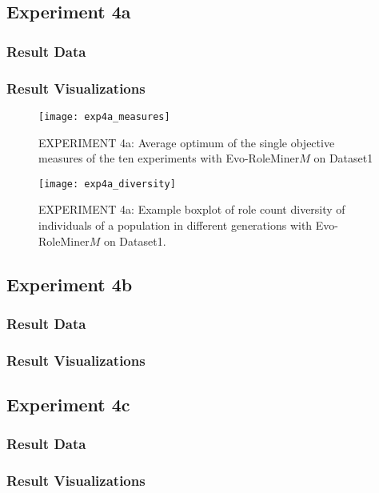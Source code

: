 	\subsection{Experiment 4a}
	\label{sec:A_Exp4a}
		\subsubsection{Result Data}
		\label{sec:A_Exp4a_Data}
		\subsubsection{Result Visualizations}
		\label{sec:A_Exp4a_Diagrams}
			\begin{figure}[H]
				\centering
				\texttt{[image: exp4a\_measures]}
				\caption{EXPERIMENT 4a: Average optimum of the single objective measures of the ten experiments with Evo-RoleMiner$M$ on Dataset1}
				\label{fig:exp4a_measures}
			\end{figure}
			\begin{figure}[H]
				\centering
				\texttt{[image: exp4a\_diversity]}
				\caption{EXPERIMENT 4a: Example boxplot of role count diversity of individuals of a population in different generations with Evo-RoleMiner$M$ on Dataset1.}
				\label{fig:exp4a_diversity}
			\end{figure}

	\subsection{Experiment 4b}
	\label{sec:A_Exp4b}
		\subsubsection{Result Data}
		\label{sec:A_Exp4b_Data}
		\subsubsection{Result Visualizations}
		\label{sec:A_Exp4b_Diagrams}
	
	\subsection{Experiment 4c}
	\label{sec:A_Exp4c}
		\subsubsection{Result Data}
		\label{sec:A_Exp4c_Data}
		\subsubsection{Result Visualizations}
		\label{sec:A_Exp4c_Diagrams}			

